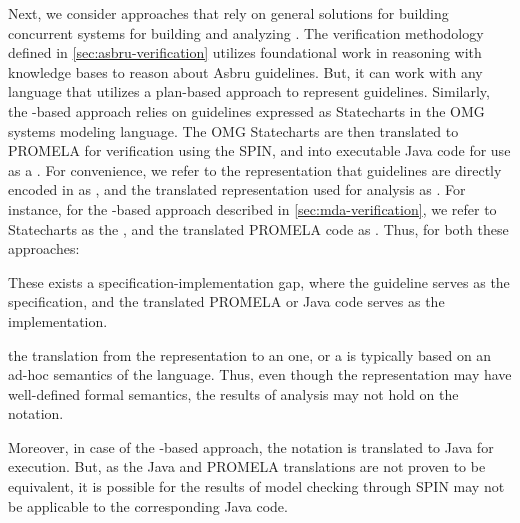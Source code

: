 Next, we consider approaches that rely on general solutions for building
concurrent systems for building and analyzing \CDSSs{}. The verification methodology
defined in \autoref{sec:asbru-verification} utilizes foundational work in
reasoning with knowledge bases to reason about Asbru guidelines. But, it
can work with any language that utilizes a plan-based approach to
represent guidelines. Similarly, the \MDA{}-based approach relies
on guidelines expressed as Statecharts in the OMG systems modeling language.
The OMG Statecharts are then translated to PROMELA for verification using the SPIN,
and into executable Java code for use as a \CDSS{}.
For convenience, we refer to the representation that guidelines are directly
encoded in as , and the translated representation
used for analysis as .
For instance, for the \MDA{}-based approach described in \autoref{sec:mda-verification}, we refer to Statecharts as the 
, and the translated PROMELA code as .
Thus, for both these approaches:
\begin{enumerate*}[label=(\alph*)]
  \item These exists a specification-implementation gap, where the
     guideline serves as the specification, and the
    translated PROMELA or Java code serves as the implementation.
  \item the translation from the  representation to
    an  one, or a  is typically based on an
    ad-hoc semantics of the  language. Thus, even though
    the  representation may have well-defined formal
    semantics, the results of analysis may not hold on the 
    notation.
\end{enumerate*}
Moreover, in case of the \MDA{}-based approach, the 
notation is translated to Java for execution. But, as the Java and
PROMELA translations are not proven to be equivalent, it is possible for
the results of model checking through SPIN may not be applicable to the
corresponding Java code.








